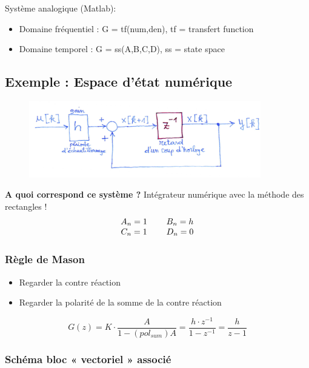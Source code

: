 \documentclass[document.tex]{subfiles}
\begin{document}
Système analogique (Matlab): 
\begin{itemize}
\item Domaine fréquentiel : G = tf(num,den), tf = transfert function
\item Domaine temporel :  G = ss(A,B,C,D), ss = state space
\end{itemize}

\subsection{Exemple : Espace d'état numérique}

\begin{figure}[H]
    \centering
    \includegraphics[width=0.9\textwidth]{Include/Figure/17.png}
\end{figure}

\textbf{A quoi correspond ce système ?}
Intégrateur numérique avec la méthode des rectangles !\\

\begin{equation}
\begin{array}{c c c}
	A_n = 1 & \; & B_n = h \\
	C_n = 1 & \; & D_n = 0
\end{array}
\end{equation}

\subsubsection{Règle de Mason}

\begin{itemize}
\item Regarder la contre réaction
\item Regarder la polarité de la somme de la contre réaction
\end{itemize}
\begin{equation}
	\boxed{G(z) = K \cdot \frac{A}{1 -(pol_{sum})A} = \frac{h \cdot z^{-1}}{1-z^{-1}} = \frac{h}{z-1}}
\end{equation}

\subsubsection{Schéma bloc « vectoriel » associé}
\end{document}
